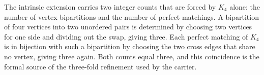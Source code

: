 \documentclass[11pt]{article}
\begin{document}
The intrinsic extension carries two integer counts that are forced by
$K_4$ alone: the number of vertex bipartitions and the number of
perfect matchings.  A bipartition of four vertices into two unordered
pairs is determined by choosing two vertices for one side and dividing
out the swap, giving three.  Each perfect matching of $K_4$ is in
bijection with such a bipartition by choosing the two cross edges that
share no vertex, giving three again.  Both counts equal three, and
this coincidence is the formal source of the three-fold refinement
used by the carrier.

\begin{code}%
\>[0]\<%
\\
\>[0]\AgdaSpace{}%
\AgdaSpace{}%
\AgdaSymbol{:}\AgdaSpace{}%
\AgdaSpace{}%
\<%
\\
\>[0][@{}l@{\AgdaIndent{0}}]%
\>[2]\<%
\\
\>[2][@{}l@{\AgdaIndent{0}}]%
\>[4]%
\>[31]\AgdaSymbol{:}\AgdaSpace{}%
\<%
\\
%
\>[4]%
\>[31]\AgdaSymbol{:}\AgdaSpace{}%
\<%
\\
%
\>[4]%
\>[31]\AgdaSymbol{:}\AgdaSpace{}%
\<%
\\
%
\>[4]%
\>[31]\AgdaSymbol{:}\AgdaSpace{}%
\<%
\\
%
\>[4]\AgdaSpace{}%
\AgdaSymbol{:}\AgdaSpace{}%
\AgdaSpace{}%
\AgdaSpace{}%
\<%
\\
%
\>[4]%
\>[31]\AgdaSymbol{:}\AgdaSpace{}%
\AgdaSpace{}%
\AgdaSpace{}%
\<%
\\
%
\>[4]%
\>[31]\AgdaSymbol{:}\AgdaSpace{}%
\AgdaSpace{}%
\AgdaSpace{}%
\<%
\\
%
\>[4]\AgdaSpace{}%
\AgdaSymbol{:}\AgdaSpace{}%
\AgdaSpace{}%
\AgdaSpace{}%
\<%
\\
%
\>[4]\AgdaSpace{}%

\end{code}
\end{document}
